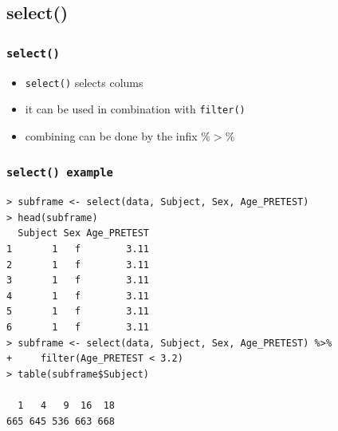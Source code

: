 \documentclass[xcolor={table},c]{beamer}
\begin{document}
\subsection{select()}
\begin{frame}[fragile]\frametitle{\texttt{select()}}
  \begin{itemize}
  \item \texttt{select()} selects colums
  \item it can be used in combination with \texttt{filter()}
  \item combining can be done by the infix $\%>\%$
  \end{itemize}
\end{frame}

\begin{frame}[fragile]\frametitle{\texttt{select() example}}\footnotesize
\begin{verbatim}
> subframe <- select(data, Subject, Sex, Age_PRETEST)
> head(subframe)
  Subject Sex Age_PRETEST
1       1   f        3.11
2       1   f        3.11
3       1   f        3.11
4       1   f        3.11
5       1   f        3.11
6       1   f        3.11
> subframe <- select(data, Subject, Sex, Age_PRETEST) %>%
+     filter(Age_PRETEST < 3.2)
> table(subframe$Subject)

  1   4   9  16  18 
665 645 536 663 668 
\end{verbatim}
\end{frame}
\end{document}
